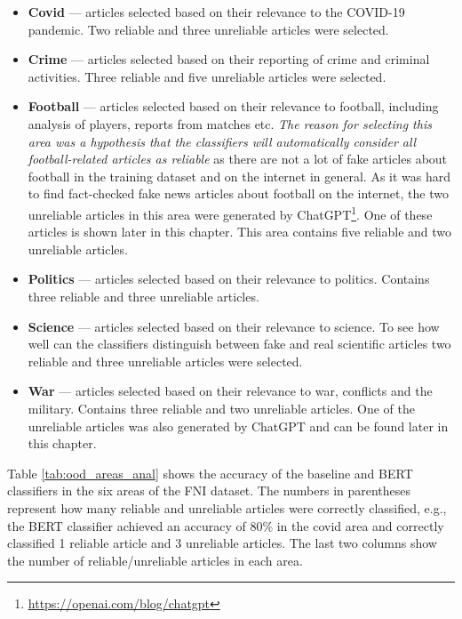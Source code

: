 \begin{itemize}
    \item \textbf{Covid} --- articles selected based on their relevance to the COVID-19 pandemic. Two reliable and three unreliable articles were selected.
    \item \textbf{Crime} --- articles selected based on their reporting of crime and criminal activities. Three reliable and five unreliable articles were selected.
    \item \textbf{Football} --- articles selected based on their relevance to football, including analysis of players, reports from matches etc. \emph{The reason for selecting this area was a hypothesis that the classifiers will automatically consider all football-related articles as reliable} as there are not a lot of fake articles about football in the training dataset and on the internet in general. As it was hard to find fact-checked fake news articles about football on the internet, the two unreliable articles in this area were generated by ChatGPT\footnote{\url{https://openai.com/blog/chatgpt}}. One of these articles is shown later in this chapter. This area contains five reliable and two unreliable articles.  
    \item \textbf{Politics} --- articles selected based on their relevance to politics. Contains three reliable and three unreliable articles.
    \item \textbf{Science} --- articles selected based on their relevance to science. To see how well can the classifiers distinguish between fake and real scientific articles two reliable and three unreliable articles were selected. 
    \item \textbf{War} --- articles selected based on their relevance to war, conflicts and the military. Contains three reliable and two unreliable articles. One of the unreliable articles was also generated by ChatGPT and can be found later in this chapter. 
\end{itemize}

Table \ref{tab:ood_areas_anal} shows the accuracy of the baseline and BERT classifiers in the six areas of the FNI dataset. The numbers in parentheses represent how many reliable and unreliable articles were correctly classified, e.g., the BERT classifier achieved an accuracy of 80\% in the covid area and correctly classified 1 reliable article and 3 unreliable articles. The last two columns show the number of reliable/unreliable articles in each area.


